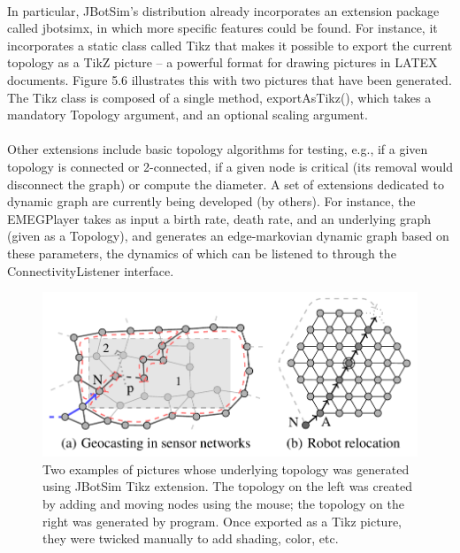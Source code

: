 \paragraph{}In particular, JBotSim’s distribution already incorporates an extension package called jbotsimx, in which more specific features could be found. For instance, it incorporates a static class called Tikz that makes it possible to export the current topology as a TikZ picture – a powerful format for drawing pictures in LATEX documents. Figure 5.6 illustrates this with two pictures that have been generated. The Tikz class is composed of a single method, exportAsTikz(), which takes a mandatory Topology argument, and an optional scaling argument.
\paragraph{}Other extensions include basic topology algorithms for testing, e.g., if a given topology is connected or 2-connected, if a given node is critical (its removal would disconnect the graph) or compute the diameter. A set of extensions dedicated to dynamic graph are currently being developed (by others). For instance, the EMEGPlayer takes as input a birth rate, death rate, and an underlying graph (given as a Topology), and generates an edge-markovian dynamic graph based on these parameters, the dynamics of which can be listened to through the ConnectivityListener interface.

\begin{figure}[h]
	\centering
	\includegraphics[width=0.7\linewidth]{fig_7}
	\caption[Two examples of pictures whose underlying topology was generated using JBotSim Tikz extension. The topology on the left was created by adding and moving nodes using the mouse; the topology on the right was generated by program. Once exported as a Tikz picture, they were twicked manually to add shading, color, etc.]{Two examples of pictures whose underlying topology was generated using JBotSim Tikz extension. The topology on the left was created by adding and moving nodes using the mouse; the topology on the right was generated by program. Once exported as a Tikz picture, they were twicked manually to add shading, color, etc.}
	\label{fig:fig7}
\end{figure}


